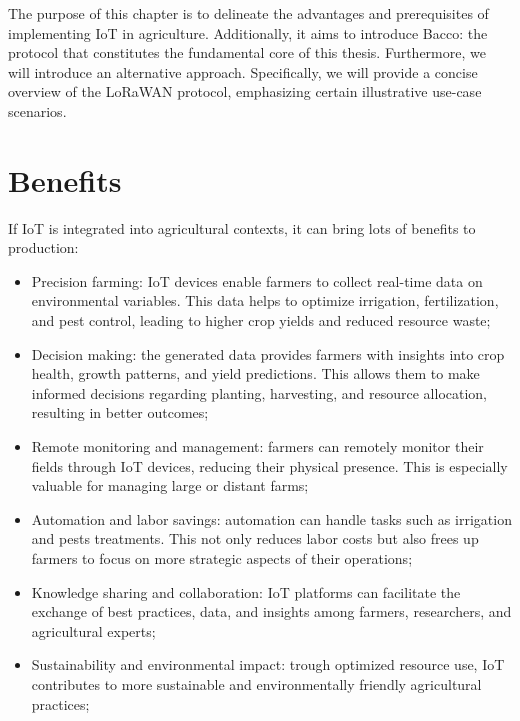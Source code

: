 

The purpose of this chapter is to delineate the advantages and prerequisites of implementing \gls{IoT} in agriculture.
Additionally, it aims to introduce Bacco: the protocol that constitutes the fundamental core of this thesis. Furthermore,
we will introduce an alternative approach. Specifically, we will provide a concise overview of the \gls{LoRaWAN}
protocol, emphasizing certain illustrative use-case scenarios.

\section{Benefits}
\label{sec: benefits}
If \gls{IoT} is integrated into agricultural contexts, it can bring lots of benefits to production:
\begin{itemize}
    \item Precision farming: IoT devices enable farmers to collect real-time data on environmental variables. This data
        helps to optimize irrigation, fertilization, and pest control, leading to higher crop yields and reduced resource
        waste;
    \item Decision making: the generated data provides farmers with insights into crop health, growth
        patterns, and yield predictions. This allows them to make informed decisions regarding planting, harvesting, and
        resource allocation, resulting in better outcomes;
    \item Remote monitoring and management: farmers can remotely monitor their fields through IoT devices,
        reducing their physical presence. This is especially valuable for managing large or distant
        farms;
    \item Automation and labor savings: automation can handle tasks such as irrigation and pests
        treatments. This not only reduces labor costs but also frees up farmers to focus on more strategic aspects of
        their operations;
    \item Knowledge sharing and collaboration: IoT platforms can facilitate the exchange of best practices, data, and
        insights among farmers, researchers, and agricultural experts;
    \item Sustainability and environmental impact: trough optimized resource use, IoT contributes to more sustainable
        and environmentally friendly agricultural practices;
\end{itemize}
\\
